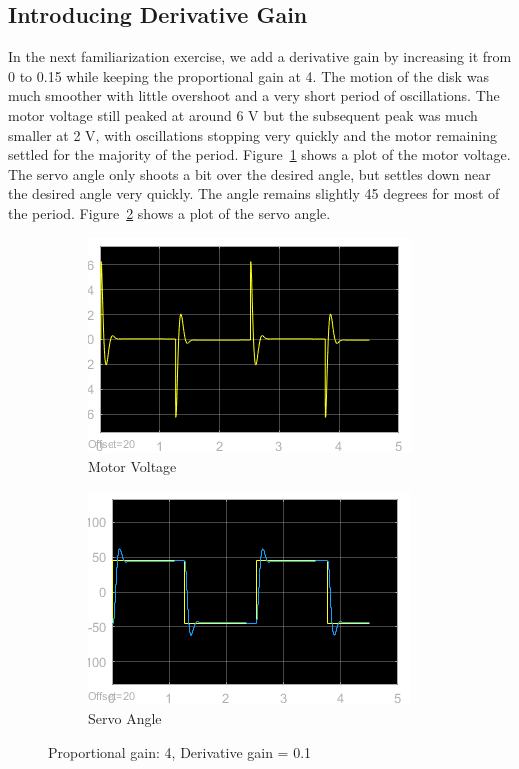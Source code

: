 \documentclass[12pt]{article}
\begin{document}
\subsection*{Introducing Derivative Gain} %
In the next familiarization exercise, we add a derivative gain by increasing it from 0 to 0.15 while keeping the proportional gain at 4. The motion of the disk was much smoother with little overshoot and a very short period of oscillations. The motor voltage still peaked at around 6 V but the subsequent peak was much smaller at 2 V, with oscillations stopping very quickly and the motor remaining settled for the majority of the period. Figure~\ref{fig:xi_volt} shows a plot of the motor voltage. The servo angle only shoots a bit over the desired angle, but settles down near the desired angle very quickly. The angle remains slightly 45 degrees for most of the period. Figure~\ref{fig:xi_angle} shows a plot of the servo angle.
\begin{figure}[h!]
    \centering
    \begin{subfigure}[b]{0.49\textwidth}
        \includegraphics[width=\textwidth]{xi_voltage}
        \caption{\label{fig:xi_volt}Motor Voltage}
    \end{subfigure}
    \begin{subfigure}[b]{0.49\textwidth}
        \includegraphics[width=\textwidth]{xi_angle}
        \caption{\label{fig:xi_angle}Servo Angle}    
    \end{subfigure}
    \caption{\label{fig:xi} Proportional gain: 4, Derivative gain = 0.1}
\end{figure}
\end{document}
